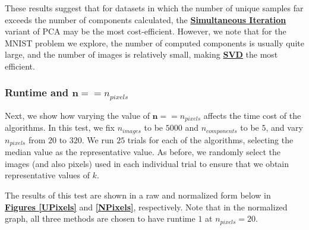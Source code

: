 \documentclass[12pt]{article}
\begin{document}
These results suggest that for datasets in which the number of unique samples far exceeds the number of components calculated, the \textbf{\hyperref[3.3]{Simultaneous Iteration}} variant of PCA may be the most cost-efficient. However, we note that for the MNIST problem we explore, the number of computed components is usually quite large, and the number of images is relatively small, making \textbf{\hyperref[3.2]{SVD}} the most efficient. 

\subsubsection{Runtime and $\textbf{n} == n_{pixels}$}\label{5.1.3}

Next, we show how varying the value of $\textbf{n} == n_{pixels}$ affects the time cost of the algorithms. In this test, we fix $n_{images}$ to be $5000$ and $n_{components}$ to be $5$, and vary $n_{pixels}$ from $20$ to $320$. We run $25$ trials for each of the algorithms, selecting the median value as the representative value. As before, we randomly select the images (and also pixels) used in each individual trial to ensure that we obtain representative values of $k$. 

The results of this test are shown in a raw and normalized form below in \textbf{\hyperref[UPixels]{Figures \ref*{UPixels}}} and \textbf{\hyperref[NPixels]{\ref*{NPixels}}}, respectively. Note that in the normalized graph, all three methods are chosen to have runtime $1$ at $n_{pixels} = 20$.
\end{document}
